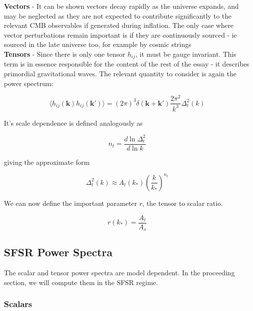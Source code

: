 \documentclass[a4paper,10pt]{article}
\renewcommand{\v}[1]{\mathbf{#1}}
\begin{document}
\textbf{Vectors} - It can be shown vectors decay rapidly as the universe expands, and may be neglected as they are not expected to contribute significantly to the relevant CMB observables if generated during inflation. The only case where vector perturbations remain important is if they are continuously sourced - ie sourced in the late universe too, for example by cosmic strings\\

\textbf{Tensors} - Since there is only one tensor $h_{ij}$, it must be gauge invariant. This term is in essence responsible for the content of the rest of the essay - it describes primordial gravitational waves. The relevant quantity to consider is again the power spectrum:

\begin{equation}
\langle h_{ij}(\v{k})h_{ij}(\v{k'}) \rangle=(2\pi)^3\delta(\v{k}+\v{k'})\frac{2\pi^2}{k^3}\Delta^2_t(k)
\end{equation}

It's scale dependence is defined analogously as 

\begin{equation}
n_t = \frac{d\ln{\Delta^2_t}}{d\ln{k}}
\end{equation}

giving the approximate form 

\begin{equation}
\Delta^2_t(k) \approx A_t(k_*)(\frac{k}{k_*})^{n_t}
\end{equation}

We can now define the important parameter $r$, the tensor to scalar ratio.

\begin{equation}
r(k_*)=\frac{A_t}{A_s} 
\end{equation}

\subsection{SFSR Power Spectra}

The scalar and tensor power spectra are model dependent. In the proceeding section, we will compute them in the SFSR regime.

\subsubsection{Scalars}
\end{document}
